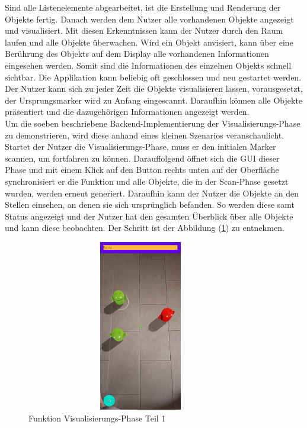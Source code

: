 Sind alle Listenelemente abgearbeitet, ist die Erstellung und Renderung der Objekte fertig. Danach werden dem Nutzer alle vorhandenen Objekte angezeigt und 
visualisiert. Mit diesen Erkenntnissen kann der Nutzer durch den Raum laufen und alle Objekte überwachen. Wird ein Objekt anvisiert, kann über eine Berührung 
des Objekts auf dem Display alle vorhandenen Informationen eingesehen werden. Somit sind die Informationen des einzelnen Objekts schnell sichtbar.  
Die Applikation kann beliebig oft geschlossen und neu gestartet werden. Der Nutzer kann sich zu jeder Zeit die Objekte visualisieren lassen, vorausgesetzt, der 
Ursprungsmarker wird zu Anfang eingescannt. Daraufhin können alle Objekte präsentiert und die dazugehörigen Informationen angezeigt werden. %
\\ 
\linebreak
Um die soeben beschriebene Backend-Implementierung der Visualisierungs-Phase zu demonstrieren, wird diese anhand eines kleinen Szenarios veranschaulicht. 
\\ 
Startet der Nutzer die Visualisierungs-Phase, muss er den initialen Marker scannen, um fortfahren zu können. Darauffolgend öffnet sich die \acs{GUI} dieser 
Phase und mit einem Klick auf den Button rechts unten auf der Oberfläche synchronisiert er die Funktion und alle Objekte, die in der Scan-Phase gesetzt wurden, 
werden erneut generiert. Daraufhin kann der Nutzer die Objekte an den Stellen einsehen, an denen sie sich ursprünglich befanden. So werden diese samt Status 
angezeigt und der Nutzer hat den gesamten Überblick über alle Objekte und kann diese beobachten. Der Schritt ist der Abbildung (\ref{pic:visual_objects}) 
zu entnehmen. 
\begin{figure}[hbt!]
    \centering
    \includegraphics[width=10cm,height=7.5cm,keepaspectratio]{4Umsetzung/Bilder/show_objects_after_loading.jpg}
    \caption{Funktion Visualisierungs-Phase Teil 1}
    \label{pic:visual_objects}
\end{figure}
